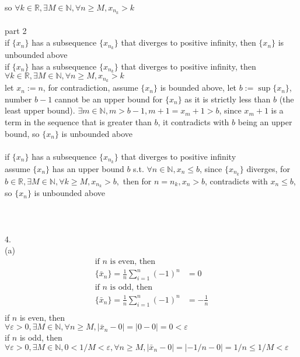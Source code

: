 \documentclass[12pt, border = 4pt, multi]{article} %
\begin{document}
so $\forall k \in \mathbb{R}, \exists M \in \mathbb{N}, \forall n \geq M, x_{n_k} > k$\\
\\
part 2\\
if $\{x_n\}$ has a subsequence $\{x_{n_k}\}$ that diverges to positive infinity, then $\{x_n\}$ is unbounded above\\
if $\{x_n\}$ has a subsequence $\{x_{n_k}\}$ that diverges to positive infinity, then\\
$\forall k \in \mathbb{R}, \exists M \in \mathbb{N}, \forall n \geq M, x_{n_k} > k$\\
let $x_n := n$, for contradiction, assume $\{x_n\}$ is bounded above, let $b := \sup\{x_n\}$, number $b - 1$ cannot be an upper bound for $\{x_n\}$ as it is strictly less than $b$ (the least upper bound). $\exists m \in \mathbb{N}, m > b - 1, m + 1 = x_m + 1 > b$, since $x_m + 1$ is a term in the sequence that is greater than $b$, it contradicts with $b$ being an upper bound, so $\{x_n\}$ is unbounded above\\
\\
if $\{x_n\}$ has a subsequence $\{x_{n_k}\}$ that diverges to positive infinity\\
assume $\{x_n\}$ has an upper bound $b$ s.t. $\forall n \in \mathbb{N}, x_n \leq b$, since $\{x_{n_k}\}$ diverges, for $b \in \mathbb{R}, \exists M \in \mathbb{N}, \forall k \geq M, x_{n_k} > b,$ then for $n = n_k, x_n > b$, contradicts with $x_n \leq b$, so $\{x_n\}$ is unbounded above\\
\\
\\
\\
4.\\
(a)
\begin{align*}
\text{if } n \text{ is even, then }\\
\{\bar{x}_n\} = \frac{1}{n}\sum_{i = 1} ^ n (-1) ^ n &= 0\\
\text{if } n \text{ is odd, then }\\
\{\bar{x}_n\} = \frac{1}{n}\sum_{i = 1} ^ n (-1) ^ n &= -\frac{1}{n}\\ 
\end{align*}
if $n$ is even, then\\
$\forall \varepsilon > 0, \exists M \in \mathbb{N}, \forall n \geq M, |\bar{x}_n - 0| = |0 - 0| = 0 < \varepsilon$\\
if $n$ is odd, then\\
$\forall \varepsilon > 0, \exists M \in \mathbb{N}, 0 < 1 / M < \varepsilon, \forall n \geq M, |\bar{x}_n - 0| = |-1 / n - 0| = 1 / n \leq 1 / M < \varepsilon$\\
\end{document}
